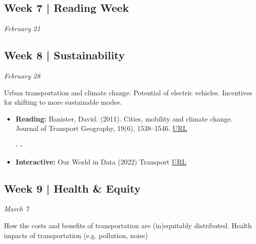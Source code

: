 \documentclass[11pt]{article}
\begin{document}
	
	
	
	
	\subsection*{Week 7 | Reading Week}
	
	\textit{February 21}
	
	
	
	\subsection*{Week 8 | Sustainability}
	
	\textit{February 28}
	
	Urban transportation and climate change. Potential of electric vehicles. Incentives for shifting to more sustainable modes.
	
	
	\begin{itemize}
		\item \textbf{Reading:} Banister, David. (2011). Cities, mobility and climate change. Journal of Transport
		Geography, 19(6), 1538–1546. \href{https://doi.org/10.1016/j.jtrangeo.2011.03.009}{URL}
		
		- -
		
		\item \textbf{Interactive:} Our World in Data (2022) Transport \href{https://ourworldindata.org/transport}{URL}
	\end{itemize}

	
	
	
	
	\subsection*{Week 9 | Health \& Equity}
	
	\textit{March 7}
	
	How the costs and benefits of transportation are (in)equitably distributed. Health impacts of transportation (e.g. pollution, noise)
	
\end{document}

